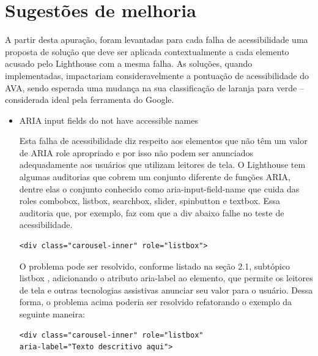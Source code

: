 \documentclass[
	12pt,				%
	openright,			%
	oneside,			%
	a4paper,			%
	chapter=TITLE,		%
	section=TITLE,		%
	subsection=TITLE,	%
	subsubsection=TITLE,%
	english,			%
	brazil				%
	]{abntex2}
\theoremstyle{definition}
\begin{document}
\section{Sugestões de melhoria}

A partir desta apuração, foram levantadas para cada falha de acessibilidade uma proposta de solução que deve ser aplicada contextualmente a cada elemento acusado pelo Lighthouse com a mesma falha. As soluções, quando implementadas, impactariam consideravelmente a pontuação de acessibilidade do AVA, sendo esperada uma mudança na sua classificação de laranja para verde – considerada ideal pela ferramenta do Google.


\begin{itemize}

    \item ARIA input fields do not have accessible names
    
Esta falha de acessibilidade diz respeito aos elementos que não têm um valor de ARIA role apropriado e por isso não podem ser anunciados adequadamente aos usuários que utilizam leitores de tela. O Lighthouse tem algumas auditorias que cobrem um conjunto diferente de funções ARIA, dentre elas o conjunto conhecido como aria-input-field-name que cuida das roles combobox, listbox, searchbox, slider, spinbutton e textbox. Essa auditoria que, por exemplo, faz com que a div abaixo falhe no teste de acessibilidade.

\begin{center}
\begin{minipage}{10cm}
\begin{verbatim}
<div class="carousel-inner" role="listbox">
\end{verbatim}
\end{minipage}
\end{center}

O problema pode ser resolvido, conforme listado na seção 2.1, subtópico listbox \cite{world2014accessible}, adicionando o atributo aria-label ao elemento, que permite os leitores de tela e outras tecnologias assistivas anunciar seu valor para o usuário. Dessa forma, o problema acima poderia ser resolvido refatorando o exemplo da seguinte maneira:

\begin{center}
\begin{minipage}{10cm}
\begin{verbatim}
<div class="carousel-inner" role="listbox"
aria-label="Texto descritivo aqui">
\end{verbatim}
\end{minipage}
\end{center}
    

\end{itemize}
\end{document}
